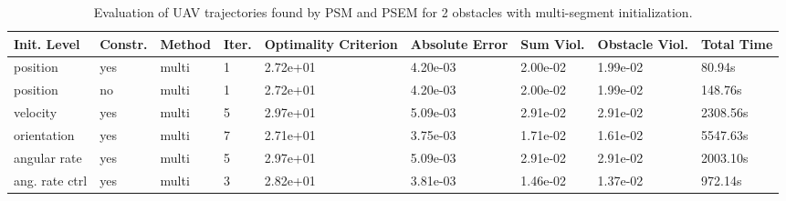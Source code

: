 \begin{table}
\small

\caption{Evaluation of UAV trajectories found by PSM and PSEM for 2 obstacles with multi-segment initialization.}
\label{tab:traj-plan-eval-simple2-multi}
\begin{tabular}{p{21mm}p{9mm}p{12mm}p{6mm}p{14mm}p{14mm}p{14mm}p{14mm}p{14mm}}
\toprule
Init. Level & Constr. & Method & Iter. & Optimality Criterion & Absolute Error & Sum Viol. & Obstacle Viol. & Total Time \\
\midrule
position & yes & multi & \cellcolor{color3} 1 & 2.72e+01 & 4.20e-03 & 2.00e-02 & 1.99e-02 & \cellcolor{color3} 80.94s \\
position & no & multi & \cellcolor{color3} 1 & 2.72e+01 & 4.20e-03 & 2.00e-02 & 1.99e-02 & 148.76s \\
velocity & yes & multi & 5 & \cellcolor{color8} 2.97e+01 & \cellcolor{color8} 5.09e-03 & \cellcolor{color8} 2.91e-02 & \cellcolor{color8} 2.91e-02 & 2308.56s \\
orientation & yes & multi & \cellcolor{color8} 7 & \cellcolor{color3} 2.71e+01 & \cellcolor{color3} 3.75e-03 & 1.71e-02 & 1.61e-02 & \cellcolor{color8} 5547.63s \\
angular rate & yes & multi & 5 & \cellcolor{color8} 2.97e+01 & \cellcolor{color8} 5.09e-03 & \cellcolor{color8} 2.91e-02 & \cellcolor{color8} 2.91e-02 & 2003.10s \\
ang. rate ctrl & yes & multi & 3 & 2.82e+01 & 3.81e-03 & \cellcolor{color3} 1.46e-02 & \cellcolor{color3} 1.37e-02 & 972.14s \\
\bottomrule
\end{tabular}
\end{table}
